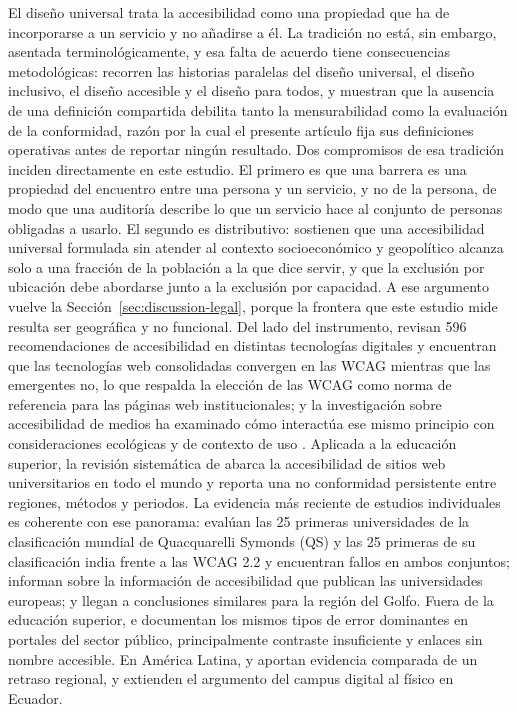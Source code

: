 \documentclass[pdflatex,sn-basic,Numbered,iicol]{sn-jnl}
\theoremstyle{thmstyleone}
\theoremstyle{thmstyletwo}
\theoremstyle{thmstylethree}
\begin{document}
El dise\~no universal trata la accesibilidad como una propiedad que ha de incorporarse a un servicio y no a\~nadirse a \'el. La tradici\'on no est\'a, sin embargo, asentada terminol\'ogicamente, y esa falta de acuerdo tiene consecuencias metodol\'ogicas: \citet{persson2015universal} recorren las historias paralelas del dise\~no universal, el dise\~no inclusivo, el dise\~no accesible y el dise\~no para todos, y muestran que la ausencia de una definici\'on compartida debilita tanto la mensurabilidad como la evaluaci\'on de la conformidad, raz\'on por la cual el presente art\'iculo fija sus definiciones operativas antes de reportar ning\'un resultado. Dos compromisos de esa tradici\'on inciden directamente en este estudio. El primero es que una barrera es una propiedad del encuentro entre una persona y un servicio, y no de la persona, de modo que una auditor\'ia describe lo que un servicio hace al conjunto de personas obligadas a usarlo. El segundo es distributivo: \citet{abascal2016rethinking} sostienen que una accesibilidad universal formulada sin atender al contexto socioecon\'omico y geopol\'itico alcanza solo a una fracci\'on de la poblaci\'on a la que dice servir, y que la exclusi\'on por ubicaci\'on debe abordarse junto a la exclusi\'on por capacidad. A ese argumento vuelve la Secci\'on~\ref{sec:discussion-legal}, porque la frontera que este estudio mide resulta ser geogr\'afica y no funcional. Del lado del instrumento, \citet{etxabeantia2025characterisation} revisan 596 recomendaciones de accesibilidad en distintas tecnolog\'ias digitales y encuentran que las tecnolog\'ias web consolidadas convergen en las WCAG mientras que las emergentes no, lo que respalda la elecci\'on de las WCAG como norma de referencia para las p\'aginas web institucionales; y la investigaci\'on sobre accesibilidad de medios ha examinado c\'omo interact\'ua ese mismo principio con consideraciones ecol\'ogicas y de contexto de uso \citep{hermosaramirez2025universal}. Aplicada a la educaci\'on superior, la revisi\'on sistem\'atica de \citet{campoverdemolina2023accessibility} abarca la accesibilidad de sitios web universitarios en todo el mundo y reporta una no conformidad persistente entre regiones, m\'etodos y periodos. La evidencia m\'as reciente de estudios individuales es coherente con ese panorama: \citet{krittika2025accessibility} eval\'uan las 25 primeras universidades de la clasificaci\'on mundial de Quacquarelli Symonds (QS) y las 25 primeras de su clasificaci\'on india frente a las WCAG 2.2 y encuentran fallos en ambos conjuntos; \citet{krejtz2025higher} informan sobre la informaci\'on de accesibilidad que publican las universidades europeas; y \citet{fakrudeen2025evaluation} llegan a conclusiones similares para la regi\'on del Golfo. Fuera de la educaci\'on superior, \citet{aljedaani2025egovernment} e \citet{iniesto2025service} documentan los mismos tipos de error dominantes en portales del sector p\'ublico, principalmente contraste insuficiente y enlaces sin nombre accesible. En Am\'erica Latina, \citet{acostavargas2020dataset} y \citet{acostavargas2020improve} aportan evidencia comparada de un retraso regional, y \citet{maldonadogarces2025physical} extienden el argumento del campus digital al f\'isico en Ecuador.
\end{document}
